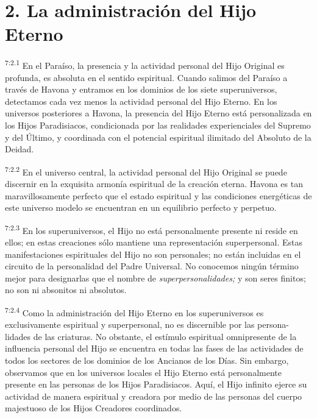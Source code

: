 \section*{2. La administración del Hijo Eterno}
\par
\textsuperscript{7:2.1} En el Paraíso, la presencia y la actividad personal del Hijo Original es profunda, es absoluta en el sentido espiritual. Cuando salimos del Paraíso a través de Havona y entramos en los dominios de los siete superuniversos, detectamos cada vez menos la actividad personal del Hijo Eterno. En los universos posteriores a Havona, la presencia del Hijo Eterno está personalizada en los Hijos Paradisiacos, condicionada por las realidades experienciales del Supremo y del Último, y coordinada con el potencial espiritual ilimitado del Absoluto de la Deidad.

\par
\textsuperscript{7:2.2} En el universo central, la actividad personal del Hijo Original se puede discernir en la exquisita armonía espiritual de la creación eterna. Havona es tan maravillosamente perfecto que el estado espiritual y las condiciones energéticas de este universo modelo se encuentran en un equilibrio perfecto y perpetuo.

\par
\textsuperscript{7:2.3} En los superuniversos, el Hijo no está personalmente presente ni reside en ellos; en estas creaciones sólo mantiene una representación superpersonal. Estas manifestaciones espirituales del Hijo no son personales; no están incluidas en el circuito de la personalidad del Padre Universal. No conocemos ningún término mejor para designarlas que el nombre de \textit{superpersonalidades;} y son seres finitos; no son ni absonitos ni absolutos.

\par
\textsuperscript{7:2.4} Como la administración del Hijo Eterno en los superuniversos es exclusivamente espiritual y superpersonal, no es discernible por las persona-lidades de las criaturas. No obstante, el estímulo espiritual omnipresente de la influencia personal del Hijo se encuentra en todas las fases de las actividades de todos los sectores de los dominios de los Ancianos de los Días. Sin embargo, observamos que en los universos locales el Hijo Eterno está personalmente presente en las personas de los Hijos Paradisiacos. Aquí, el Hijo infinito ejerce su actividad de manera espiritual y creadora por medio de las personas del cuerpo majestuoso de los Hijos Creadores coordinados.

